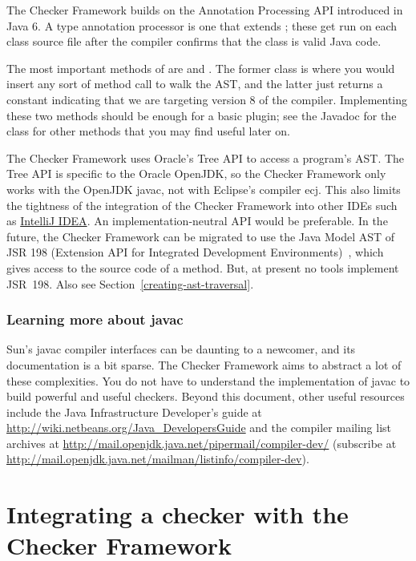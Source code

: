The Checker Framework builds on the Annotation Processing API
introduced in Java 6.  A type annotation processor is one that extends
; these get run on each class
source file after the compiler confirms that the class is valid Java code.

The most important methods of 
are  and . The former
class is where you would insert any sort of method call to walk the AST\@,
and the latter just returns a constant indicating that we are targeting
version 8 of the compiler. Implementing these two methods should be enough
for a basic plugin; see the Javadoc for the class for other methods that
you may find useful later on.

The Checker Framework uses Oracle's Tree API to access a program's AST\@.
The Tree API is specific to the Oracle OpenJDK, so the Checker Framework only
works with the OpenJDK javac, not with Eclipse's compiler ecj.
This also limits the tightness of
the integration of the Checker Framework into other IDEs such as \href{http://www.jetbrains.com/idea/}{IntelliJ IDEA}\@.
An implementation-neutral API would be preferable.
In the future, the Checker Framework
can be migrated to use the Java Model AST of JSR 198 (Extension API for
Integrated Development Environments)~\cite{JSR198}, which gives access to
the source code of a method.  But, at present no tools
implement JSR~198.  Also see Section~\ref{creating-ast-traversal}.



\subsubsection{Learning more about javac\label{creating-learning-more-about-javac}}

Sun's javac compiler interfaces can be daunting to a
newcomer, and its documentation is a bit sparse. The Checker Framework
aims to abstract a lot of these complexities.
You do not have to understand the implementation of javac to
build powerful and useful checkers.
Beyond this document,
other useful resources include the Java Infrastructure
Developer's guide at
\url{http://wiki.netbeans.org/Java_DevelopersGuide} and the compiler
mailing list archives at
\url{http://mail.openjdk.java.net/pipermail/compiler-dev/}
(subscribe at
\url{http://mail.openjdk.java.net/mailman/listinfo/compiler-dev}).


\section{Integrating a checker with the Checker Framework\label{creating-integrating-a-checker}}

